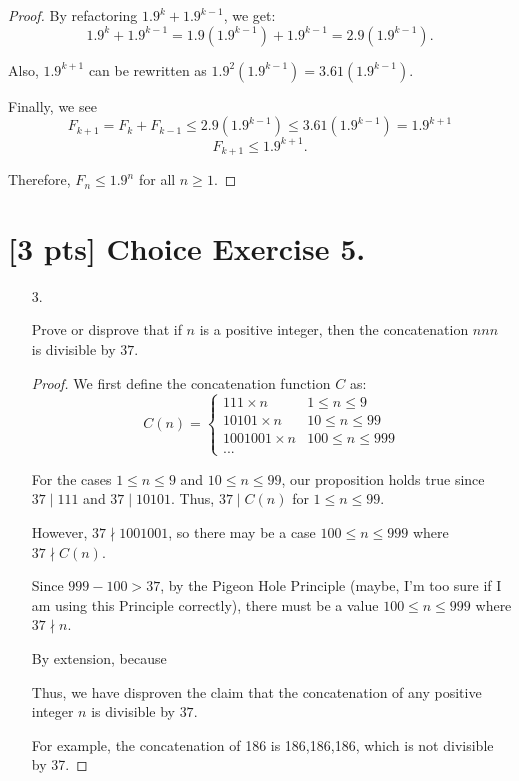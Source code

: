 \documentclass{article}
\begin{document}
\begin{enumerate}
{\begin{proof}
            By refactoring \(1.9^k + 1.9^{k-1}\), we get:
            \[1.9^k + 1.9^{k-1} = 1.9(1.9^{k-1}) + 1.9^{k-1} = 2.9(1.9^{k-1}).\]

            Also, \(1.9^{k+1}\) can be rewritten as \(1.9^2 (1.9^{k-1}) = 3.61(1.9^{k-1})\).

            Finally, we see
            \[F_{k+1} = F_k + F_{k-1} \le 2.9(1.9^{k-1}) \le 3.61(1.9^{k-1}) = 1.9^{k+1}\]
            \[F_{k+1} \le 1.9^{k+1}.\]

            Therefore, \(F_n \le 1.9^n\) for all \(n \ge 1\).
        \end{proof}
    }
\end{enumerate}

\section*{[3 pts] Choice Exercise 5.}

\begin{enumerate}
    \item[3.] {
        Prove or disprove that if \(n\) is a positive integer, then the concatenation 
        \(nnn\) is divisible by \(37\). 

        \begin{proof}
            We first define the concatenation function \(C\) as: 
            \[C(n) = \begin{cases}
                111 \times n & 1 \le n \le 9 \\
                10101 \times n & 10 \le n \le 99 \\
                1001001 \times n & 100 \le n \le 999 \\
                ...

            \end{cases}\]

            For the cases \(1 \le n \le 9\) and \(10 \le n \le 99\), our proposition 
            holds true since \(37 \mid 111\) and \(37 \mid 10101\). Thus, \(37 \mid C(n)\)
            for \(1 \le n \le 99\).

            However, \(37 \nmid 1001001\), so there may be a case \(100 \le n \le 999\) 
            where \(37 \nmid C(n)\). 

            Since \(999 - 100 > 37\), by the Pigeon Hole Principle (maybe, I'm 
            too sure if I am using this Principle correctly), there must be a 
            value \(100 \le n \le 999\) where \(37 \nmid n\). 

            By extension, because 

            Thus, we have disproven the claim that the concatenation of any positive
            integer \(n\) is divisible by \(37\). 

            For example, the concatenation of 186 is 186,186,186, which is not 
            divisible by 37.
        \end{proof}
    }
\end{enumerate}
\end{document}

